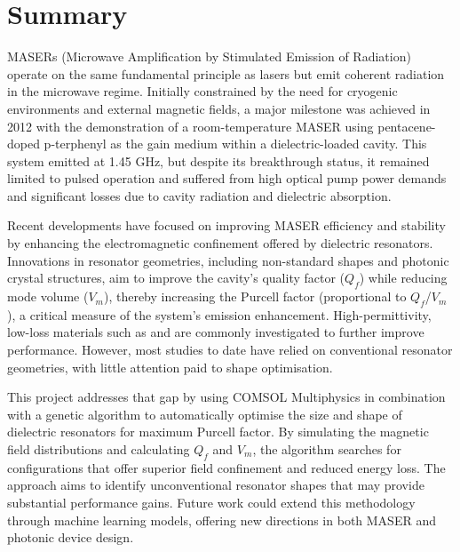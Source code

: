 \section{Summary}
\label{sec:section6}
MASERs (Microwave Amplification by Stimulated Emission of Radiation) operate on
the same fundamental principle as lasers but emit coherent radiation in the
microwave regime. Initially constrained by the need for cryogenic environments
and external magnetic fields, a major milestone was achieved in 2012 with the
demonstration of a room-temperature MASER using pentacene-doped p-terphenyl as
the gain medium within a dielectric-loaded cavity. This system emitted at 1.45
GHz, but despite its breakthrough status, it remained limited to pulsed
operation and suffered from high optical pump power demands and significant
losses due to cavity radiation and dielectric absorption.

Recent developments have focused on improving MASER efficiency and stability by
enhancing the electromagnetic confinement offered by dielectric resonators.
Innovations in resonator geometries, including non-standard shapes and photonic
crystal structures, aim to improve the cavity’s quality factor ($Q_f$) while
reducing mode volume ($V_m$), thereby increasing the Purcell factor
(proportional to $Q_f$/$V_m$), a critical measure of the system's emission
enhancement. High-permittivity, low-loss materials such as  and
 are commonly investigated to further improve performance. However,
most studies to date have relied on conventional resonator geometries, with
little attention paid to shape optimisation.

This project addresses that gap by using COMSOL Multiphysics\textregistered{} in
combination with a genetic algorithm to automatically optimise the size and
shape of dielectric resonators for maximum Purcell factor. By simulating the
magnetic field distributions and calculating $Q_f$ and $V_m$, the algorithm
searches for configurations that offer superior field confinement and reduced
energy loss. The approach aims to identify unconventional resonator shapes that
may provide substantial performance gains. Future work could extend this
methodology through machine learning models, offering new directions in both
MASER and photonic device design.
